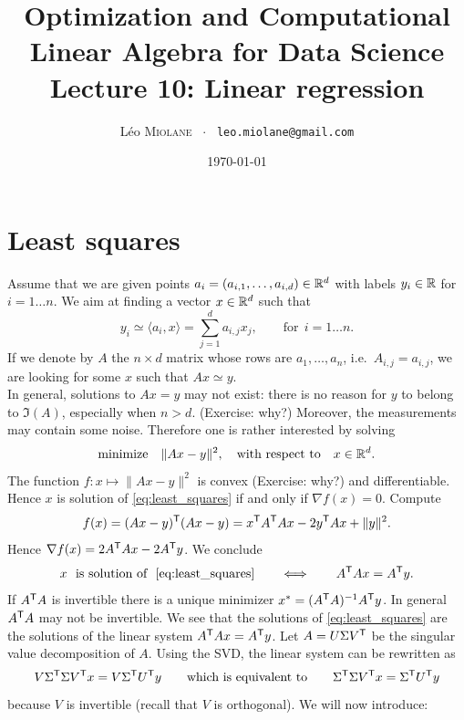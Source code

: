 \documentclass[11pt,nocut]{article}
\title{\vspace{-2.0cm}%
	Optimization and Computational Linear Algebra for Data Science\\
Lecture 10: Linear regression}
\author{Léo \textsc{Miolane} \ $\cdot$ \ \texttt{leo.miolane@gmail.com}}
\date{\today}
\begin{document}
\maketitle


\section{Least squares}

Assume that we are given points $a_i = (a_{i,1}, \dots, a_{i,d}) \in \mathbb{R}^d$ with labels $y_i \in \mathbb{R}$ for $i=1 \dots n$.
We aim at finding a vector $x\in\mathbb{R}^d$ such that
$$
y_i \simeq \langle a_i, x \rangle = \sum_{j=1}^d a_{i,j} x_j, \qquad \text{for} \ \ i=1 \dots n.
$$
If we denote by $A$ the $n \times d$ matrix whose rows are $a_1, \dots, a_n$, i.e.\ $A_{i,j} = a_{i,j}$, we are looking for some $x$ such that $Ax \simeq y$.
\\

In general, solutions to $Ax=y$ may not exist: there is no reason for $y$ to belong to $\Im(A)$, especially when $n > d$. (Exercise: why?)
Moreover, the measurements may contain some noise.
Therefore one is rather interested by solving
\begin{equation}\label{eq:least_squares}
	\text{minimize} \quad \| Ax - y \|^2, \quad \text{with respect to} \quad x \in \mathbb{R}^d.
\end{equation}
The function $f: x \mapsto \|Ax - y\|^2$ is convex (Exercise: why?) and differentiable. Hence
$x$ is solution of \eqref{eq:least_squares} if and only if $\nabla f (x) = 0$. Compute
$$
f(x) = (Ax - y)^{{\sf T}}(Ax - y) = x^{{\sf T}} A^{{\sf T}} A x - 2 y^{{\sf T}} A x + \|y\|^2.
$$
Hence $\nabla f(x) = 2 A^{{\sf T}} A x - 2 A^{{\sf T}} y$. We conclude
$$
x \ \ \text{is solution of} \ \ \eqref{eq:least_squares} \qquad
\Longleftrightarrow
\qquad A^{\sT} A x = A^{\sT} y.
$$
If $A^{{\sf T}} A$ is invertible there is a unique minimizer $x^* = (A^{{\sf T}} A)^{-1} A^{{\sf T}} y$.
In general $A^{{\sf T}} A$ may not be invertible. We see that the solutions of \eqref{eq:least_squares} are the solutions of the linear system $A^{{\sf T}} A x = A^{{\sf T}} y$. 
Let $A=U\Sigma V^{{\sf T}}$ be the singular value decomposition of $A$. Using the SVD, the linear system can be rewritten as
\begin{equation}\label{eq:simpSVD}
V \Sigma^{{\sf T}} \Sigma V^{{\sf T}} x = V \Sigma^{{\sf T}} U^{{\sf T}} y
\qquad
\text{which is equivalent to}
\qquad
\Sigma^{{\sf T}} \Sigma V^{{\sf T}} x = \Sigma^{{\sf T}} U^{{\sf T}} y
\end{equation}
because $V$ is invertible (recall that $V$ is orthogonal). We will now introduce:
\end{document}
